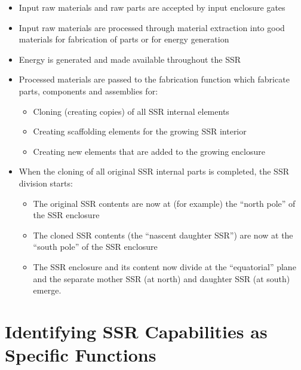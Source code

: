 \begin{itemize}
\item Input raw materials and raw parts are accepted by input enclosure
gates
\item Input raw materials are processed through material extraction into
good materials for fabrication of parts or for energy generation
\item Energy is generated and made available throughout the SSR
\item Processed materials are passed to the fabrication function which fabricate parts, components and
assemblies for: 

\begin{itemize}
\item Cloning (creating copies) of all SSR internal elements
\item Creating scaffolding elements for the growing SSR interior
\item Creating new elements that are added to the growing enclosure
\end{itemize}
\item When the cloning of all original SSR internal parts is completed,
the SSR division starts:

\begin{itemize}
\item The original SSR contents are now at (for example) the “north pole”
of the SSR enclosure
\item The cloned SSR contents (the “nascent daughter SSR”) are now at the
“south pole” of the SSR enclosure
\item The SSR enclosure and its content now divide at the “equatorial”
plane and the separate mother SSR (at north) and daughter SSR (at south)
emerge.
\end{itemize}
\end{itemize}

\section[Identifying SSR Capabilities]{Identifying SSR Capabilities as Specific Functions}

